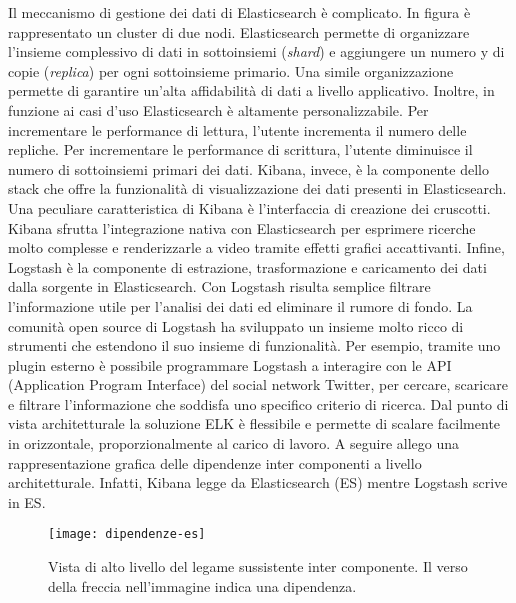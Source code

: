 \begin{itemize}
	Il meccanismo di gestione dei dati di Elasticsearch è complicato. In figura è rappresentato un cluster di due nodi. Elasticsearch permette di organizzare l'insieme complessivo di dati in sottoinsiemi (\textit{shard}) e aggiungere un numero y di copie (\textit{replica}) per ogni sottoinsieme primario. Una simile organizzazione permette di garantire un'alta affidabilità di dati 
	a livello applicativo. Inoltre, in funzione ai casi d'uso Elasticsearch è altamente personalizzabile.
	Per incrementare le performance di lettura, l'utente incrementa il numero delle repliche. Per incrementare le performance di scrittura, l'utente diminuisce il numero di sottoinsiemi primari dei dati. 	
	Kibana, invece, è la componente dello stack che offre la funzionalità di visualizzazione dei dati presenti in Elasticsearch. Una peculiare caratteristica di Kibana è l'interfaccia di creazione dei cruscotti. Kibana sfrutta l'integrazione nativa con Elasticsearch per esprimere ricerche molto complesse e renderizzarle a video tramite effetti grafici accattivanti. Infine, Logstash è la componente di estrazione, trasformazione e caricamento dei dati dalla sorgente in Elasticsearch. Con Logstash risulta semplice filtrare l'informazione utile per l'analisi dei dati ed eliminare il rumore di fondo. La comunità open source di Logstash ha sviluppato un insieme molto ricco di strumenti che estendono il suo insieme di funzionalità. Per esempio, tramite uno plugin esterno è possibile programmare Logstash a interagire con le API (Application Program Interface) del social network Twitter, per cercare, scaricare e filtrare l'informazione che soddisfa uno specifico criterio di ricerca. 
	Dal punto di vista architetturale la soluzione ELK è flessibile e permette di scalare facilmente in orizzontale, proporzionalmente al carico di lavoro. 
	A seguire allego una rappresentazione grafica delle dipendenze inter componenti a livello architetturale. Infatti, Kibana legge da Elasticsearch (ES) mentre Logstash scrive in ES.
	
	\begin{figure}[htbp]
		\begin{center}
			\texttt{[image: dipendenze-es]}
			\caption{Vista di alto livello del legame sussistente inter componente. Il verso della freccia nell'immagine indica una dipendenza.}
		\end{center}
	\end{figure}
	
	  	
\end{itemize}

